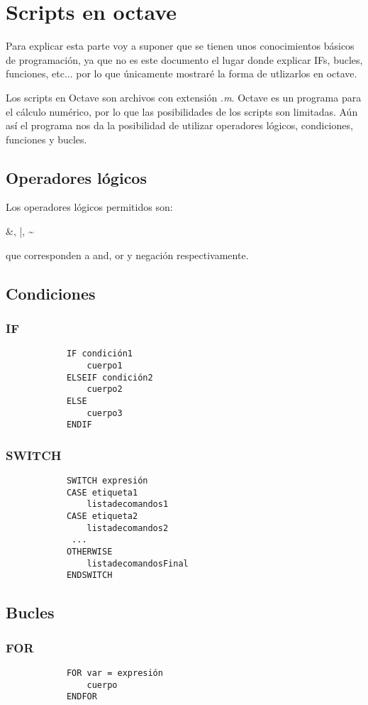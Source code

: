 \documentclass[a4,12pt,graphicx,caption,rotating]{article}
\begin{document}
\section{Scripts en octave}
Para explicar esta parte voy a suponer que se tienen unos conocimientos básicos de programación, ya que no es este documento el lugar donde explicar IFs, bucles, funciones, etc... por lo que únicamente mostraré la forma de utlizarlos en octave.

Los scripts en Octave son archivos con extensión \emph{.m}. Octave es un programa para el cálculo numérico, por lo que las posibilidades de los scripts son limitadas. Aún así el programa nos da la posibilidad de utilizar operadores lógicos, condiciones, funciones y bucles.
\subsection{Operadores lógicos}
Los operadores lógicos permitidos son:
\begin{center}
\&, |, \~~
\end{center} 
que corresponden a and, or y negación respectivamente.
\subsection{Condiciones}
\subsubsection{IF}
\begin{verbatim}
            IF condición1
                cuerpo1
            ELSEIF condición2
                cuerpo2
            ELSE
                cuerpo3
            ENDIF
\end{verbatim} 
\subsubsection{SWITCH}
\begin{verbatim}
            SWITCH expresión
            CASE etiqueta1
                listadecomandos1
            CASE etiqueta2
                listadecomandos2
             ... 
            OTHERWISE
                listadecomandosFinal
            ENDSWITCH 
\end{verbatim}
\subsection{Bucles}
\subsubsection{FOR}
\begin{verbatim}
            FOR var = expresión
                cuerpo
            ENDFOR
\end{verbatim}
\end{document}
